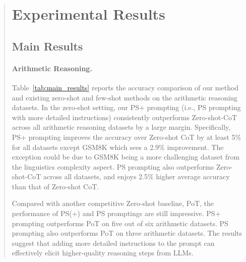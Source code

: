 \documentclass[11pt]{article}
\begin{document}
\begin{abstract}




\section{Experimental Results}

\subsection{Main Results}





\paragraph{Arithmetic Reasoning.} Table~\ref{tab:main_results} reports the accuracy comparison of our method and existing zero-shot and few-shot methods on the arithmetic reasoning datasets. 
In the zero-shot setting, our PS+ prompting (i.e., PS prompting with more detailed instructions) consistently outperforms Zero-shot-CoT across all arithmetic reasoning datasets by a large margin.
Specifically, PS+ prompting improves the accuracy over Zero-shot CoT by at least 5\% for all datasets except GSM8K which sees a 2.9\% improvement. 
The exception could be due to GSM8K being a more challenging dataset from the linguistics complexity aspect. 
PS prompting also outperforms Zero-shot-CoT across all datasets, and enjoys 2.5\% higher average accuracy than that of Zero-shot CoT. 

Compared with another competitive Zero-shot baseline, PoT, the performance of PS(+) and PS promptings are still impressive. PS+ prompting outperforms PoT on five out of six arithmetic datasets. PS prompting also outperforms PoT on three arithmetic datasets.
The results suggest that adding more detailed instructions to the prompt can effectively elicit higher-quality reasoning steps from LLMs.


\end{abstract}
\end{document}
